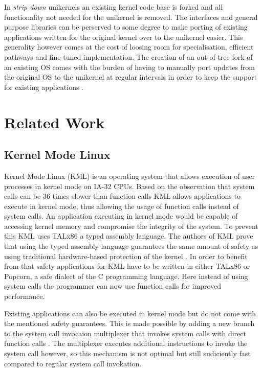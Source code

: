 \documentclass[10pt,twocolumn,a4paper]{article}
\begin{document}
      In \textit{strip down} unikernels an existing kernel code base is forked
      and all functionality not needed for the unikernel is removed.
      The interfaces and general purpose libraries can be perserved to some degree
      to make porting of existing applications written for the original kernel
      over to the unikernel easier. 
      This generality however comes at the cost of loosing room for specialisation,
      efficient pathways and fine-tuned implementation.
      The creation of an out-of-tree fork of an existing OS comes with the burden of
      having to manually port updates from the original OS to the unikernel at regular intervals
      in order to keep the support for existing applications \cite{raza19}.
      
\section{Related Work}\label{sec:relwork} 
  \subsection{Kernel Mode Linux}
    Kernel Mode Linux (KML) is an operating system that allows
    execution of user processes in kernel mode on IA-32 CPUs.
    Based on the observation that system calls can be 36 times slower
    than function calls \cite{maeda2003} KML allows applications to execute in
    kernel mode, thus allowing the usage of function calls instead of system calls.
    An application executing in kernel mode would be capable of accessing kernel
    memory and compromise the integrity of the system.
    To prevent this KML uses TALx86 a typed assembly language.
    The authors of KML prove that using the typed assembly language guarantees the 
    same amount of safety as using traditional hardware-based protection of the kernel \cite{maeda2003}.
    In order to benefit from that safety applications for KML have to be written in
    either TALx86 or Popcorn, a safe dialect of the C programming language.
    Here instead of using system calls the programmer can now use function calls for improved performance.

    Existing applications can also be executed in kernel mode but do not come with
    the mentioned safety guarantees.
    This is made possible by adding a new branch to the system call invocaion multiplexer
    that invokes system calls with direct function calls \cite{maeda2003}.
    The multiplexer executes additional instructions to invoke the system call however, 
    so this mechanism is not optimal but still sudiciently fast compared to regular system call
    invokation.
\end{document}
